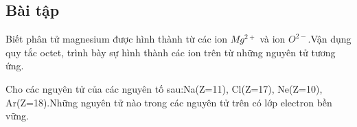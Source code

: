 \subsection{Bài tập}
\begin{ex}
	Biết phân tử magnesium được hình thành từ các ion $Mg^{2+}$ và ion $O^{2-}$.Vận dụng quy tắc octet, trình bày sự hình thành các ion trên từ những nguyên tử tương ứng.
\end{ex}
\begin{ex}
	Cho các nguyên tử của các nguyên tố sau:Na(Z=11), Cl(Z=17), Ne(Z=10), Ar(Z=18).Những nguyên tử nào trong các nguyên tử trên có lớp electron bền vững.
\end{ex}

















